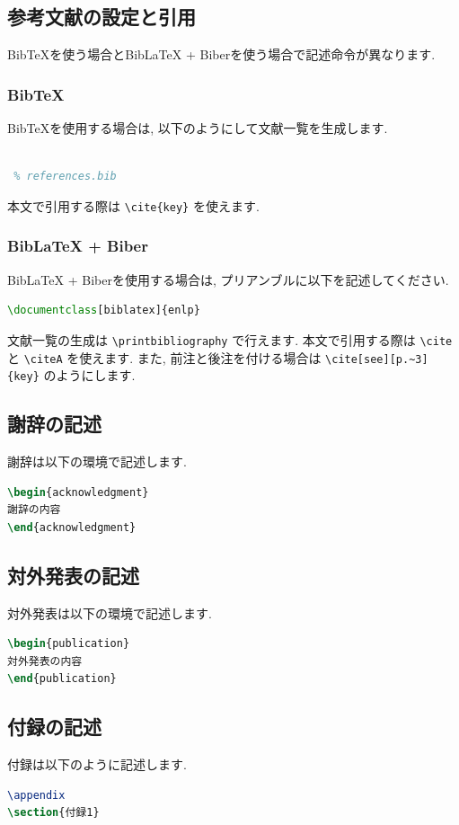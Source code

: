 \documentclass{ltjsarticle}
\newcommand{\cs}[1]{\texttt{\textbackslash#1}}
\begin{document}
\subsection{参考文献の設定と引用}
BibTeXを使う場合とBibLaTeX + Biberを使う場合で記述命令が異なります.
\subsubsection{BibTeX}
BibTeXを使用する場合は, 以下のようにして文献一覧を生成します. 
\begin{lstlisting}[language=TeX]

 % references.bib
\end{lstlisting}
本文で引用する際は \cs{cite\{key\}} を使えます. 
\subsubsection{BibLaTeX + Biber}
BibLaTeX + Biberを使用する場合は, プリアンブルに以下を記述してください. 
\begin{lstlisting}[language=TeX]
\documentclass[biblatex]{enlp}

\end{lstlisting}
文献一覧の生成は \cs{printbibliography} で行えます. 
本文で引用する際は \cs{cite} と \cs{citeA} を使えます. 
また, 前注と後注を付ける場合は \cs{cite[see][p.\textasciitilde3]\{key\}} のようにします. 
\subsection{謝辞の記述}
謝辞は以下の環境で記述します.
\begin{lstlisting}[language=TeX]
\begin{acknowledgment}
謝辞の内容
\end{acknowledgment}
\end{lstlisting}
\subsection{対外発表の記述}
対外発表は以下の環境で記述します.
\begin{lstlisting}[language=TeX]
\begin{publication}
対外発表の内容
\end{publication}
\end{lstlisting}
\subsection{付録の記述}
付録は以下のように記述します.
\begin{lstlisting}[language=TeX]
\appendix
\section{付録1}
\end{lstlisting}
\end{document}

